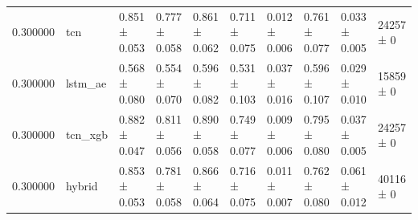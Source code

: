 \begin{tabular}{rlllllllll}
0.300000 & tcn & 0.851 ± 0.053 & 0.777 ± 0.058 & 0.861 ± 0.062 & 0.711 ± 0.075 & 0.012 ± 0.006 & 0.761 ± 0.077 & 0.033 ± 0.005 & 24257 ± 0 \\
0.300000 & lstm\_ae & 0.568 ± 0.080 & 0.554 ± 0.070 & 0.596 ± 0.082 & 0.531 ± 0.103 & 0.037 ± 0.016 & 0.596 ± 0.107 & 0.029 ± 0.010 & 15859 ± 0 \\
0.300000 & tcn\_xgb & 0.882 ± 0.047 & 0.811 ± 0.056 & 0.890 ± 0.058 & 0.749 ± 0.077 & 0.009 ± 0.006 & 0.795 ± 0.080 & 0.037 ± 0.005 & 24257 ± 0 \\
0.300000 & hybrid & 0.853 ± 0.053 & 0.781 ± 0.058 & 0.866 ± 0.064 & 0.716 ± 0.075 & 0.011 ± 0.007 & 0.762 ± 0.080 & 0.061 ± 0.012 & 40116 ± 0 \\
\bottomrule
\end{tabular}

